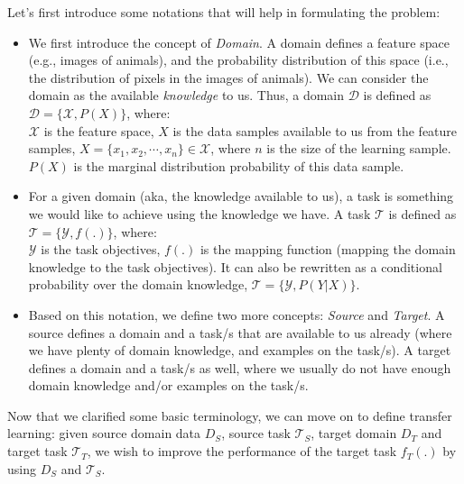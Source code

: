   \par Let's first introduce some notations that will help in formulating the problem:
  \begin{itemize}
      \item We first introduce the concept of \textit{Domain}. A domain defines a feature space (e.g., images of animals), and the probability distribution of this space (i.e., the distribution of pixels in the images of animals). We can consider the domain as the available \textit{knowledge} to us. Thus, a domain $\mathcal{D}$ is defined as $\mathcal{D} = \{\mathcal{X}, P(X)\}$, where:\\
      $\mathcal{X}$ is the feature space, $X$ is the data samples available to us from the feature samples, $X = \{x_1,x_2,\cdots,x_n\} \in \mathcal{X}$, where $n$ is the size of the learning sample. $P(X)$ is the marginal distribution probability of this data sample.

      \item For a given domain (aka, the knowledge available to us), a task is something we would like to achieve using the knowledge we have. A task $\mathcal{T}$ is defined as $\mathcal{T} = \{\mathcal{Y}, f(.)\}$, where:\\
      $\mathcal{Y}$ is the task objectives, $f(.)$ is the mapping function (mapping the domain knowledge to the task objectives). It can also be rewritten as a conditional probability over the domain knowledge, $\mathcal{T} = \{\mathcal{Y}, P(Y|X)\}$.

      \item Based on this notation, we define two more concepts: \textit{Source} and \textit{Target}. A source defines a domain and a task/s that are available to us already (where we have plenty of domain knowledge, and examples on the task/s). A target defines a domain and a task/s as well, where we usually do not have enough domain knowledge and/or examples on the task/s.
  \end{itemize}

  \par Now that we clarified some basic terminology, we can move on to define transfer learning: given source domain data $D_S$, source task $\mathcal{T}_S$,  target domain $D_T$ and target task $\mathcal{T}_T$, we wish to improve the performance of the target task $f_T(.)$ by using $D_S$ and $\mathcal{T}_S$.

